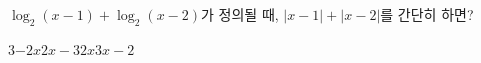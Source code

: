 $\log_2 (x-1)+\log_2 (x-2)$가 정의될 때, $|x-1|+|x-2|$를 간단히 하면?
\begin{choices32}{$3$}{$-2x$}{$2x-3$}{$2x$}{$3x-2$}\end{choices32}
